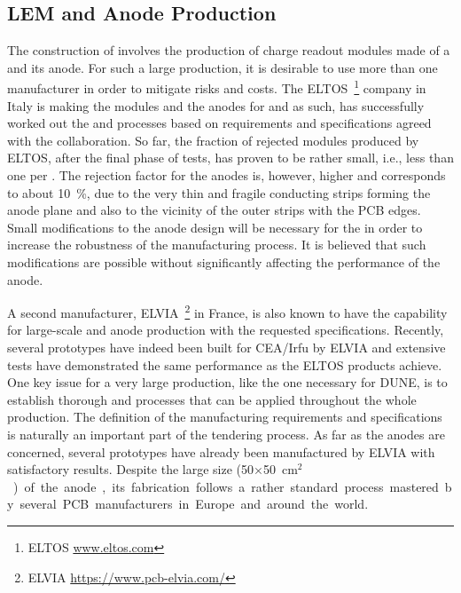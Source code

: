 \subsection{LEM and Anode Production}
\label{sec:fddp-crp-LASprod}


The construction of %
 involves the production of \dpnumswch charge readout modules made of a  and its anode. For such a large production, it is desirable to use more than one manufacturer in order to mitigate risks and costs. The ELTOS~\footnote{ ELTOS\texttrademark{} \url{www.eltos.com}} company in Italy is making the  modules and the anodes for   and as such, has successfully worked out the  and  processes based on requirements and specifications agreed with the  collaboration. So far, the fraction of rejected  modules produced by ELTOS, after the final phase of tests, has proven to be rather small, i.e., less than one  per . The rejection factor for the anodes is, however, higher and corresponds to about \SI{10}{\%}, due to the very thin and fragile conducting strips forming the anode plane and also to the vicinity of the outer strips with the PCB edges. 
Small modifications to the anode design will be necessary for the  in order to increase the robustness of the manufacturing process. It is believed that such modifications are possible without  %
significantly affecting the performance of the anode.   

A second manufacturer, ELVIA~\footnote{ ELVIA\texttrademark{} \url{https://www.pcb-elvia.com/}} in France, is also known to have the capability for large-scale  and anode production with the requested specifications. Recently, several  prototypes have indeed been built for CEA/Irfu 
by ELVIA and extensive tests have %
demonstrated the same   performance as the ELTOS products achieve.
 One key issue for a very large production, like the one necessary for DUNE, is to establish thorough  and  processes that can be applied throughout the whole  production. The definition of the  manufacturing requirements and specifications is naturally an important part of the tendering process. As far as the anodes are concerned, several prototypes have already been manufactured by ELVIA with satisfactory results. Despite the large size (\num{50}$\times$\SI{50}{cm$^2$}) of the anode, its fabrication follows a rather standard process mastered by several PCB manufacturers in Europe and around the world.     

